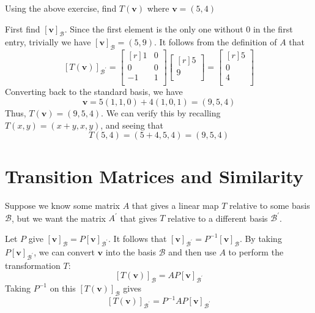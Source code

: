\begin{exercise}
    Using the above exercise, find \(T(\mathbf{v})\) where \(\mathbf{v}=(5,4)\) 
\end{exercise}
\begin{solution}
    First find \([\mathbf{v}]_\mathcal{B} \). Since the first element is the only one without \(0\) in the first entry, trivially we have \([\mathbf{v}]_\mathcal{B} =(5,9)\). It follows from the definition of \(A\) that 
    \[
        [T(\mathbf{v})]_{\mathcal{B} ^{\prime} } = \begin{bmatrix}[r]
            1 &0   \\
             0&0   \\
             -1&1   \\
        \end{bmatrix} \begin{bmatrix}[r]
             5 \\
             9 \\
        \end{bmatrix} = \begin{bmatrix}[r]
             5 \\
             0 \\
             4 \\
        \end{bmatrix}
    \]
    Converting back to the standard basis, we have 
    \[
        \mathbf{v}= 5(1,1,0) + 4(1,0,1) = (9,5,4)
    \]
    Thus, \(T(\mathbf{v}) = (9,5,4)\). We can verify this by recalling \(T(x,y)=(x+y,x,y)\), and seeing that 
    \[
        T(5,4) = (5+4,5,4)=(9,5,4)
    \]
\end{solution}
\section{Transition Matrices and Similarity}
Suppose we know some matrix \(A\) that gives a linear map \(T\) relative to some basis \(\mathcal{B} \), but we want the matrix \(A^{\prime} \) that gives \(T\) relative to a different basis \(\mathcal{B} ^{\prime} \).
\begin{figure}[ht]
\end{figure}
Let \(P\) give \([\mathbf{v}]_\mathcal{B} = P[\mathbf{v}]_{\mathcal{B} ^{\prime} }\). It follows that \([\mathbf{v}]_{\mathcal{B} ^{\prime} }=P ^{-1} [\mathbf{v}]_\mathcal{B} \). By taking \(P[\mathbf{v}]_{\mathcal{B} ^{\prime} }\), we can convert \(\mathbf{v}\) into the basis \(\mathcal{B} \) and then use \(A\) to perform the transformation \(T\):
\[
    [T(\mathbf{v})]_{\mathcal{B} } = AP[\mathbf{v}]_{\mathcal{B} ^{\prime} }
\]
Taking \(P ^{-1} \) on this \([T(\mathbf{v})]_{\mathcal{B} }\) gives 
\[
    [T(\mathbf{v})]_{\mathcal{B}^{\prime}  } = P ^{-1} AP [\mathbf{v}]_{\mathcal{B} ^{\prime} }
\]